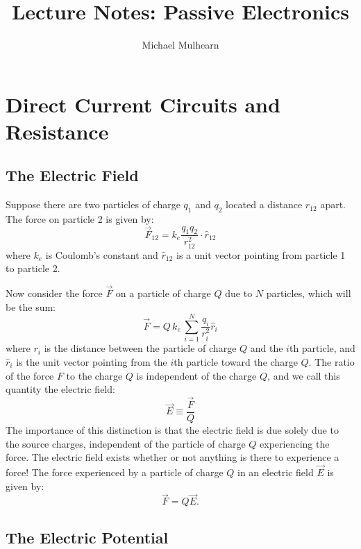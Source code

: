 \documentclass[12pt,oneside]{book}
\begin{document}

\title{Lecture Notes:  Passive Electronics}
\author{Michael Mulhearn}
\maketitle

\chapter{Direct Current Circuits and Resistance}

\section{The Electric Field}

Suppose there are two particles of charge $q_1$ and $q_2$ located a distance $r_{12}$ apart.
The force on particle 2 is given by:
\begin{displaymath}
\vec{F}_{12} = k_e \frac{q_1 q_2}{r_{12}^2} \cdot \hat{r}_{12}
\end{displaymath}
where $k_e$ is Coulomb's constant and $\hat{r}_{12}$ is a unit vector pointing from particle 1 to particle 2.

Now consider the force $\vec{F}$ on a particle of charge $Q$ due to $N$ particles, which will be the sum:
\begin{displaymath}
\vec{F} = Q \, k_e \, \sum_{i=1}^N \frac{q_i}{r_{i}^2} \hat{r}_{i}
\end{displaymath}
where $r_i$ is the distance between the particle of charge $Q$ and the $i$th particle, and $\hat{r}_i$ is the unit vector pointing from the $i$th particle toward the charge $Q$.  The ratio of the force $F$ to the charge $Q$ is independent of the charge $Q$, and we call this quantity the electric field:
\begin{displaymath}
\vec{E} \equiv \frac{\vec{F}}{Q}
\end{displaymath}
The importance of this distinction is that the electric field is due solely due to the source charges, independent of the particle of charge $Q$ experiencing the force.  The electric field exists whether or not anything is there to experience a force!  The force experienced by a particle of charge $Q$ in an electric field $\vec{E}$ is given by:
\begin{displaymath}
\vec{F} = Q \vec{E}.
\end{displaymath}

\section{The Electric Potential}
\end{document}

